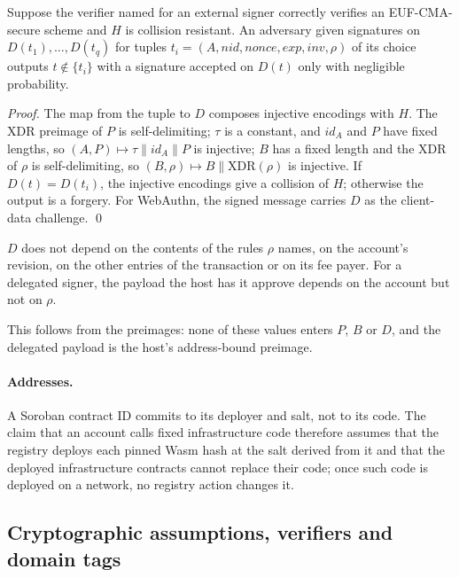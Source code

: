 \begin{lemma}[binding]\label{lem:binding}
Suppose the verifier named for an external signer correctly verifies an
EUF-CMA-secure scheme and $H$ is collision resistant. An adversary given
signatures on $D(t_1),\dots,D(t_q)$ for tuples
$t_i = (A, \mathit{nid}, \mathit{nonce}, \mathit{exp}, \mathit{inv}, \rho)$ of its
choice outputs $t\notin\{t_i\}$ with a signature accepted on $D(t)$ only with
negligible probability.
\end{lemma}

\begin{proof}
The map from the tuple to $D$ composes injective encodings with $H$. The XDR
preimage of $P$ is self-delimiting; $\tau$ is a constant, and $\mathit{id}_A$ and
$P$ have fixed lengths, so $(A, P) \mapsto \tau \| \mathit{id}_A \| P$ is
injective; $B$ has a fixed length and the XDR of $\rho$ is self-delimiting, so
$(B, \rho) \mapsto B \| \mathrm{XDR}(\rho)$ is injective. If $D(t)=D(t_i)$, the
injective encodings give a collision of $H$; otherwise the output is a forgery.
For WebAuthn, the signed message carries $D$ as the client-data challenge. \qed
\end{proof}

\begin{proposition}\label{prop:non-binding}
$D$ does not depend on the contents of the rules $\rho$ names, on the account's
revision, on the other entries of the transaction or on its fee payer. For a
delegated signer, the payload the host has it approve depends on the account but
not on $\rho$.
\end{proposition}

\noindent This follows from the preimages: none of these values enters $P$, $B$
or $D$, and the delegated payload is the host's address-bound preimage.


\paragraph{Addresses.} A Soroban contract ID commits to its deployer and salt,
not to its code. The claim that an account calls fixed infrastructure code
therefore assumes that the registry deploys each pinned Wasm hash at the salt
derived from it and that the deployed infrastructure contracts cannot replace
their code; once such code is deployed on a network, no registry action changes
it.

\subsection{Cryptographic assumptions, verifiers and domain tags}


